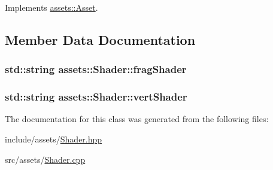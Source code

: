 Implements \hyperlink{classassets_1_1Asset_a43d029b59109ff2952206969d503c25f}{assets\-::\-Asset}.



\subsection{Member Data Documentation}
\hypertarget{classassets_1_1Shader_aa3d8e72e6225f27aa36bcfc985e80807}{
\subsubsection[{frag\-Shader}]{\setlength{\rightskip}{0pt plus 5cm}std\-::string assets\-::\-Shader\-::frag\-Shader}}\label{classassets_1_1Shader_aa3d8e72e6225f27aa36bcfc985e80807}
\hypertarget{classassets_1_1Shader_af085d461d2cffeaac347ec23c548b4eb}{
\subsubsection[{vert\-Shader}]{\setlength{\rightskip}{0pt plus 5cm}std\-::string assets\-::\-Shader\-::vert\-Shader}}\label{classassets_1_1Shader_af085d461d2cffeaac347ec23c548b4eb}


The documentation for this class was generated from the following files\-:\begin{DoxyCompactItemize}
\item 
include/assets/\hyperlink{Shader_8hpp}{Shader.\-hpp}\item 
src/assets/\hyperlink{Shader_8cpp}{Shader.\-cpp}\end{DoxyCompactItemize}
